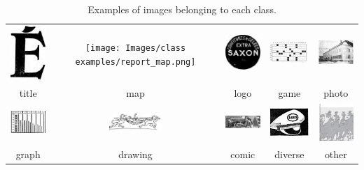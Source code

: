 \begin{table}[h]
    \centering
    \begin{tabular}{ccccc}
        \hline
        \includegraphics[width=2cm]{Images/class examples/report_title.png} & \texttt{[image: Images/class examples/report\_map.png]} & \includegraphics[width=2cm]{Images/class examples/report_logo.png} & \includegraphics[width=2cm]{Images/class examples/report_game.png} & \includegraphics[width=2cm]{Images/class examples/report_photo.png} \\
        title & map & logo & game & photo \\
        \includegraphics[width=2cm]{Images/class examples/report_graph.png} & \includegraphics[width=2cm]{Images/class examples/report_drawing.png} & \includegraphics[width=2cm]{Images/class examples/report_comic.png} & \includegraphics[width=2cm]{Images/class examples/report_diverse.jpg} & \includegraphics[width=2cm]{Images/class examples/report_other.jpg} \\
        graph & drawing & comic & diverse & other \\
        \hline
    \end{tabular}
    \caption{Examples of images belonging to each class.}
    \label{tab:images_text}
\end{table}

